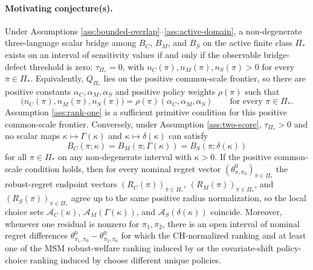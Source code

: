\documentclass[11pt]{article}
\theoremstyle{definition}
\theoremstyle{plain}
\theoremstyle{remark}
\begin{document}
\paragraph{Motivating conjecture(s).}
\begin{conjecture}\label{conj:calibration-frontier}
Under Assumptions \ref{ass:bounded-overlap}--\ref{ass:active-domain}, a non-degenerate three-language scalar bridge among $B_C$, $B_M$, and $B_S$ on the active finite class $\Pi_\ast$ exists on an interval of sensitivity values if and only if the observable bridge-defect threshold is zero: $\tau_{\Pi_\ast}=0$, with $n_C(\pi),n_M(\pi),n_S(\pi)>0$ for every $\pi\in\Pi_\ast$.  Equivalently, $Q_{\Pi_\ast}$ lies on the positive common-scale frontier, so there are positive constants $\alpha_C,\alpha_M,\alpha_S$ and positive policy weights $\rho(\pi)$ such that
\[
  \bigl(n_C(\pi),n_M(\pi),n_S(\pi)\bigr)
  = \rho(\pi)(\alpha_C,\alpha_M,\alpha_S)
  \qquad\text{for every }\pi\in\Pi_\ast.
\]
Assumption \ref{ass:rank-one} is a sufficient primitive condition for this positive common-scale frontier.  Conversely, under Assumption \ref{ass:two-score}, $\tau_{\Pi_\ast}>0$ and no scalar maps $\kappa\mapsto\Gamma(\kappa)$ and $\kappa\mapsto\delta(\kappa)$ can satisfy
\[
  B_C(\pi;\kappa)=B_M(\pi;\Gamma(\kappa))=B_S(\pi;\delta(\kappa))
\]
for all $\pi\in\Pi_\ast$ on any non-degenerate interval with $\kappa>0$.  If the positive common-scale condition holds, then for every nominal regret vector $(\theta^0_{\pi,\pi_0})_{\pi\in\Pi_\ast}$ the robust-regret endpoint vectors $(R_C(\pi))_{\pi\in\Pi_\ast}$, $(R_M(\pi))_{\pi\in\Pi_\ast}$, and $(R_S(\pi))_{\pi\in\Pi_\ast}$ agree up to the same positive radius normalization, so the local choice sets $\mathcal A_C(\kappa)$, $\mathcal A_M(\Gamma(\kappa))$, and $\mathcal A_S(\delta(\kappa))$ coincide.  Moreover, whenever one residual is nonzero for $\pi_1,\pi_2$, there is an open interval of nominal regret differences $\theta^0_{\pi_1,\pi_0}-\theta^0_{\pi_2,\pi_0}$ for which the CH-normalized ranking and at least one of the MSM robust-welfare ranking induced by \citet{JinXuZhengZhou2025} or the covariate-shift policy-choice ranking induced by \citet{AdjahoChristensen2025} choose different unique policies.
\end{conjecture}
\end{document}
